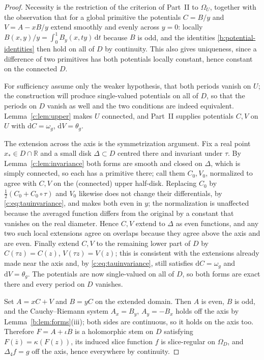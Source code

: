 \documentclass[11pt,a4paper]{article}
\numberwithin{equation}{section}
\theoremstyle{definition}
\theoremstyle{remark}
\theoremstyle{plain}
\newcommand{\RR}{\mathbb R}
\newcommand{\lap}{\Delta_4}
\newcommand{\Om}{\Omega}
\newcommand{\om}{\omega}
\newcommand{\thet}{\theta}
\newcommand{\pot}{C}          %
\newcommand{\potV}{V}         %
\newcommand{\dd}{\mathrm d}
\begin{document}
\begin{proof}
Necessity is the restriction of the criterion of Part~II to $\Om_U$,
together with the observation that for a global primitive the potentials
$\pot=B/y$ and $\potV=A-xB/y$ extend smoothly and evenly across $y=0$:
locally $B(x,y)/y=\int_0^1B_y(x,ty)\,\dd t$ because $B$ is odd, and the identities \eqref{b:potential-identities} then hold on all of $D$ by continuity.  This also gives uniqueness, since a difference of two
primitives has both potentials locally constant, hence constant on the
connected $D$.

For sufficiency assume only the weaker hypothesis, that both periods
vanish on $U$; the construction will produce single-valued potentials on
all of $D$, so that the periods on $D$ vanish as well and the two
conditions are indeed equivalent.  Lemma~\ref{c:lem:upper} makes $U$
connected, and Part~II supplies potentials $\pot,\potV$ on $U$ with
$\dd\pot=\om_g$, $\dd\potV=\thet_g$.

The extension across the axis is the symmetrization argument.  Fix a real
point $x_*\in D\cap\RR$ and a small disk $\Delta\subset D$ centred there
and invariant under $\tau$.  By Lemma~\ref{c:lem:invariance} both forms
are smooth and closed on $\Delta$, which is simply connected, so each has
a primitive there; call them $\pot_0,\potV_0$, normalized to agree with
$\pot,\potV$ on the (connected) upper half-disk.  Replacing $\pot_0$ by
$\tfrac12(\pot_0+\pot_0\circ\tau)$ and $\potV_0$ likewise does not change
their differentials, by \eqref{c:eq:tauinvariance}, and makes both even
in $y$; the normalization is unaffected because the averaged function
differs from the original by a constant that vanishes on the real
diameter.  Hence $\pot,\potV$ extend to $\Delta$ as even functions, and
any two such local extensions agree on overlaps because they agree above
the axis and are even.  Finally extend $\pot,\potV$ to the remaining
lower part of $D$ by $\pot(\tau z)=\pot(z)$, $\potV(\tau z)=\potV(z)$;
this is consistent with the extensions already made near the axis and, by
\eqref{c:eq:tauinvariance}, still satisfies $\dd\pot=\om_g$ and
$\dd\potV=\thet_g$.  The potentials are now single-valued on all of $D$,
so both forms are exact there and every period on $D$ vanishes.

Set $A=x\pot+\potV$ and $B=y\pot$ on the extended domain.  Then $A$ is
even, $B$ is odd, and the Cauchy--Riemann system $A_x=B_y$, $A_y=-B_x$
holds off the axis by Lemma~\ref{b:lem:forms}(iii); both sides are
continuous, so it holds on the axis too.  Therefore $F=A+\iota B$ is a
holomorphic stem on $D$ satisfying $F(\bar z)=\kappa(F(z))$, its induced
slice function $f$ is slice-regular on $\Om_D$, and $\lap f=g$ off the
axis, hence everywhere by continuity.
\end{proof}
\end{document}
